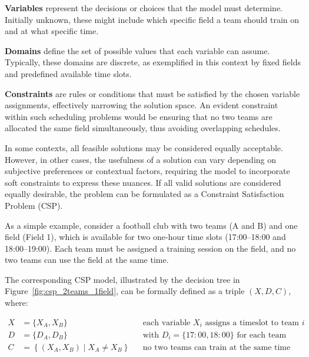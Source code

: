 \documentclass[12pt]{article}
\begin{document}
\vspace{0.5em}
\noindent
\textbf{Variables} represent the decisions or choices that the model must determine. Initially unknown, these might include which specific field a team should train on and at what specific time.

\vspace{0.5em}
\noindent
\textbf{Domains} define the set of possible values that each variable can assume. Typically, these domains are discrete, as exemplified in this context by fixed fields and predefined available time slots.

\vspace{0.5em}
\noindent
\textbf{Constraints} are rules or conditions that must be satisfied by the chosen variable assignments, effectively narrowing the solution space. An evident constraint within such scheduling problems would be ensuring that no two teams are allocated the same field simultaneously, thus avoiding overlapping schedules.

\vspace{0.5em}
\noindent
In some contexts, all feasible solutions may be considered equally acceptable. However, in other cases, the usefulness of a solution can vary depending on subjective preferences or contextual factors, requiring the model to incorporate soft constraints to express these nuances. If all valid solutions are considered equally desirable, the problem can be formulated as a Constraint Satisfaction Problem (CSP).

\vspace{0.5em}
\noindent
As a simple example, consider a football club with two teams (A and B) and one field (Field 1), which is available for two one-hour time slots (17:00–18:00 and 18:00–19:00). Each team must be assigned a training session on the field, and no two teams can use the field at the same time.

\vspace{0.5em}
\noindent
The corresponding CSP model, illustrated by the decision tree in Figure~\ref{fig:csp_2teams_1field}, can be formally defined as a triple $(X, D, C)$, where:

\begingroup
\setlength{\jot}{5pt}
\begin{equation}
\label{eq:csp_2teams}
\begin{aligned}
X &= \{X_A, X_B\} 
&& \text{each variable } X_i \text{ assigns a timeslot to team } i \\
D &= \{D_A, D_B\} 
&& \text{with } D_i = \{17{:}00, 18{:}00\} \text{ for each team} \\
C &= \left\{ (X_A, X_B) \mid X_A \neq X_B \right\} 
&& \text{no two teams can train at the same time on the same field}
\end{aligned}
\end{equation}
\endgroup
\end{document}
